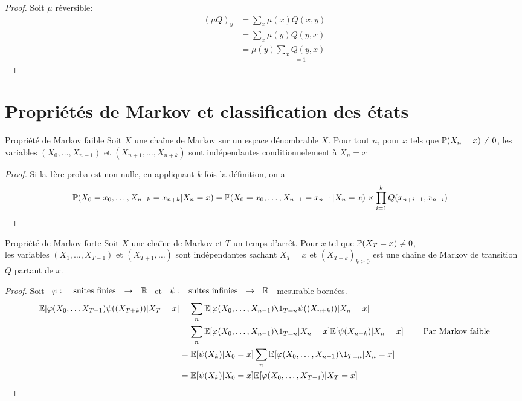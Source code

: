 \documentclass[]{report}
\begin{document}
    \begin{proof}
        Soit $\mu$ réversible:
        \begin{align*}
            (\mu Q)_y&=\sum_x \mu(x)Q(x,y)\\
            &=\sum_x \mu(y)Q(y,x)\\
            &=\mu(y)\underset{=1}{\sum_x Q(y,x)}
        \end{align*}
    \end{proof}

    \section{Propriétés de Markov et classification des états}

    \begin{tm}{Propriété de Markov faible}{}
        Soit $X$ une chaîne de Markov sur un espace dénombrable $X$. Pour tout $n$, pour $x$ tels que $\mathbb{P}(X_n=x)\neq 0$, les variables $(X_0,\ldots,X_{n-1})$ et $(X_{n+1},\ldots,X_{n+k})$ sont indépendantes conditionnelement à $X_n=x$
    \end{tm}

    \begin{proof}
        Si la 1ère proba est  non-nulle, en appliquant $k$ fois la définition, on a 
        \begin{align*}
            \mathbb{P}(X_0=x_0,\ldots,X_{n+k}=x_{n+k}|X_n=x)&=\mathbb{P}(X_0=x_0,\ldots,X_{n-1}=x_{n-1}|X_n=x)\times \prod_{i=1}^{k}Q(x_{n+i-1},x_{n+i})
        \end{align*}
    \end{proof}

    \begin{tm}{Propriété de Markov forte}{}
        Soit $X$ une chaîne de Markov et $T$ un temps d'arrêt. Pour $x$ tel que $\mathbb{P}(X_T=x)\neq 0$,\\
        les variables $(X_1,\ldots,X_{T-1})$ et $(X_{T+1},\ldots)$ sont indépendantes sachant $X_{T}=x$ et $(X_{T+k})_{k\ge 0}$ est une chaîne de Markov de transition $Q$ partant de $x$.
    \end{tm}

    \begin{proof}
        Soit $\begin{array}{ccccc} \varphi : & \text{ suites finies} & \to & \mathbb{R} \end{array}$ et $\begin{array}{ccccc} \psi : & \text{suites infinies} & \to & \mathbb{R} \end{array}$ mesurable bornées.
        \begin{align*}
            \Ea[\varphi(X_0,\ldots X_{T-1})\psi((X_{T+k}))|X_{T}=x]&=\sum_{n} \Ea[\varphi(X_0,\ldots,X_{n-1})\1_{T=n} \psi((X_{n+k}))|X_n=x]\\
            &=\sum_n \Ea[\varphi(X_0,\ldots,X_{n-1})\1_{T=n}|X_{n}=x]\Ea[\psi(X_{n+k})|X_n=x]\qquad \text{ Par Markov faible}\\
            &=\Ea[\psi(X_k)|X_0=x]\sum_{n}\Ea[\varphi(X_0,\ldots,X_{n-1})\1_{T=n}|X_n=x]\\
            &=\Ea[\psi(X_k)|X_0=x]\Ea[\varphi(X_0,\ldots,X_{T-1})|X_T=x]
        \end{align*}
    \end{proof}
\end{document}
